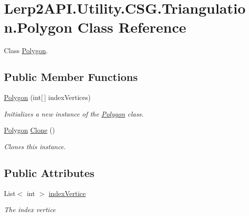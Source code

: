 \hypertarget{class_lerp2_a_p_i_1_1_utility_1_1_c_s_g_1_1_triangulation_1_1_polygon}{}\section{Lerp2\+A\+P\+I.\+Utility.\+C\+S\+G.\+Triangulation.\+Polygon Class Reference}
\label{class_lerp2_a_p_i_1_1_utility_1_1_c_s_g_1_1_triangulation_1_1_polygon}


Class \hyperlink{class_lerp2_a_p_i_1_1_utility_1_1_c_s_g_1_1_triangulation_1_1_polygon}{Polygon}.  


\subsection*{Public Member Functions}
\begin{DoxyCompactItemize}
\item 
\hyperlink{class_lerp2_a_p_i_1_1_utility_1_1_c_s_g_1_1_triangulation_1_1_polygon_a807e83bbb7ef4fa3d63ffbfbe9f80312}{Polygon} (int\mbox{[}$\,$\mbox{]} index\+Vertices)
\begin{DoxyCompactList}\small\item\em Initializes a new instance of the \hyperlink{class_lerp2_a_p_i_1_1_utility_1_1_c_s_g_1_1_triangulation_1_1_polygon}{Polygon} class. \end{DoxyCompactList}\item 
\hyperlink{class_lerp2_a_p_i_1_1_utility_1_1_c_s_g_1_1_triangulation_1_1_polygon}{Polygon} \hyperlink{class_lerp2_a_p_i_1_1_utility_1_1_c_s_g_1_1_triangulation_1_1_polygon_ad8e6f89dfaf809a390c2307b82c3b3dc}{Clone} ()
\begin{DoxyCompactList}\small\item\em Clones this instance. \end{DoxyCompactList}\end{DoxyCompactItemize}
\subsection*{Public Attributes}
\begin{DoxyCompactItemize}
\item 
List$<$ int $>$ \hyperlink{class_lerp2_a_p_i_1_1_utility_1_1_c_s_g_1_1_triangulation_1_1_polygon_aa4a42651f60f5ed96b7a9c2174efa73f}{index\+Vertice}
\begin{DoxyCompactList}\small\item\em The index vertice \end{DoxyCompactList}\end{DoxyCompactItemize}


